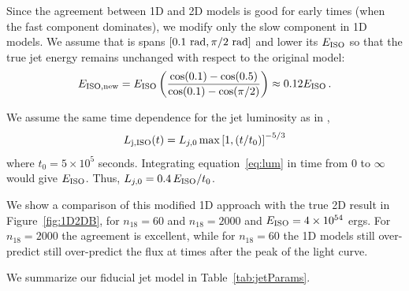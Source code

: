 \documentclass[usenatbib,fleqn]{mnras}
\begin{document}
Since the agreement between 1D and 2D models is good for early
times (when the fast component dominates), we modify only the slow
component in 1D models. We assume that is spans $[0.1\ {\rm rad},
\pi/2\ {\rm rad}]$ and lower its $E_{\rm ISO}$ so that the true jet
energy remains unchanged with respect to the original model:
\begin{equation}\label{eq:Eiso}
 E_{\rm ISO, new} = E_{\rm ISO} \left(\frac{\cos(0.1) - \cos(0.5)}{\cos(0.1) - \cos(\pi/2)}\right)\approx 0.12 E_{\rm ISO}\, .
\end{equation}

We assume the same time dependence for the jet luminosity as in
\citet{Mimica+2015},
\begin{equation}\label{eq:lum}
L_{\rm j, ISO}(t) = L_{j,0}\max\left[1, (t/t_0)\right]^{-5/3}
\end{equation}
where $t_0 = 5\times 10^5$ seconds. Integrating equation~\ref{eq:lum}
in time from $0$ to $\infty$ would give $E_{\rm ISO}$. Thus,
$L_{j,0}=0.4\, E_{\rm ISO}/t_0$. 

We show a comparison of this modified 1D approach with the true 2D
result in Figure~\ref{fig:1D2DB}, for $n_{18}=60$ and $n_{18}=2000$
and $E_{\rm ISO}=4 \times 10^{54}$ ergs. For $n_{18}=2000$ the
agreement is excellent, while for $n_{18}=60$ the 1D models still
over-predict still over-predict the flux at times after the peak of
the light curve.

We summarize our fiducial jet model in Table~\ref{tab:jetParams}.
\end{document}
